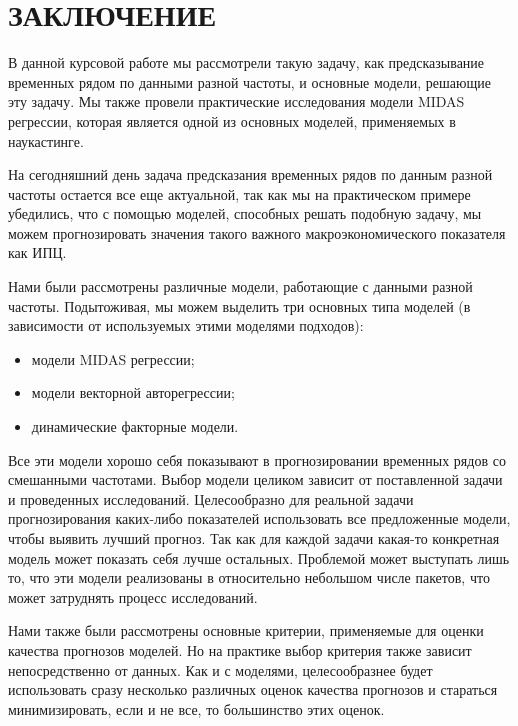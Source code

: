\documentclass[a4paper, 12pt]{extarticle}
\numberwithin{equation}{subsection}
\begin{document}
	
	\newpage
	\section*{ЗАКЛЮЧЕНИЕ}
	В данной курсовой работе мы рассмотрели такую задачу, как предсказывание временных рядом по данными разной частоты, и основные модели, решающие эту задачу. Мы также провели практические исследования модели MIDAS регрессии, которая является одной из основных моделей, применяемых в наукастинге.
	
	На сегодняшний день задача предсказания временных рядов по данным разной частоты остается все еще актуальной, так как мы на практическом примере убедились, что с помощью моделей, способных решать подобную задачу, мы можем прогнозировать значения такого важного макроэкономического показателя как ИПЦ.
	
	Нами были рассмотрены различные модели, работающие с данными разной частоты. Подытоживая, мы можем выделить три основных типа моделей (в зависимости от используемых этими моделями подходов):
	\begin{itemize}
		\item модели MIDAS регрессии;
		\item модели векторной авторегрессии;
		\item динамические факторные модели.
	\end{itemize}
	Все эти модели хорошо себя показывают в прогнозировании временных рядов со смешанными частотами. Выбор модели целиком зависит от поставленной задачи и проведенных исследований. Целесообразно для реальной задачи прогнозирования каких-либо показателей использовать все предложенные модели, чтобы выявить лучший прогноз. Так как для каждой задачи какая-то конкретная модель может показать себя лучше остальных. Проблемой может выступать лишь то, что эти модели реализованы в относительно небольшом числе пакетов, что может затруднять процесс исследований.
	
	Нами также были рассмотрены основные критерии, применяемые для оценки качества прогнозов моделей. Но на практике выбор критерия также зависит непосредственно от данных. Как и с моделями, целесообразнее будет использовать сразу несколько различных оценок качества прогнозов и стараться минимизировать, если и не все, то большинство этих оценок.
	
\end{document}
